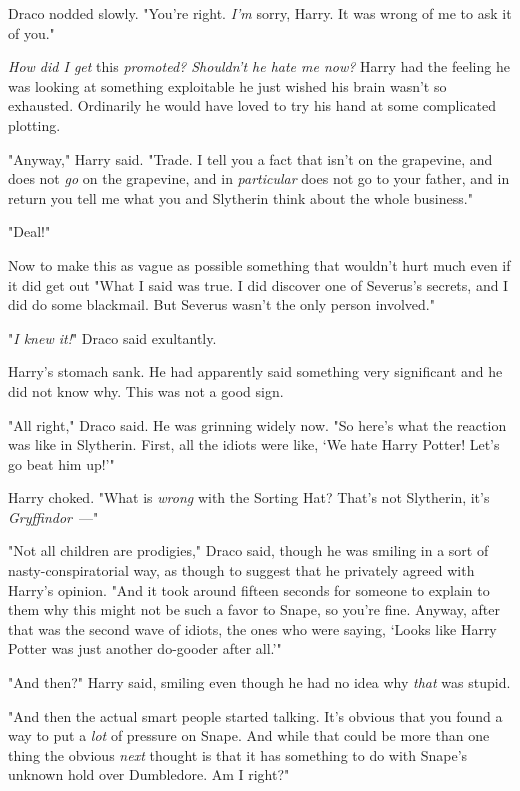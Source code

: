 Draco nodded slowly. "You're right. \emph{I'm} sorry, Harry. It was wrong of me
to ask it of you."

\emph{How did I get} this \emph{promoted? Shouldn't he hate me now?} Harry had
the feeling he was looking at something exploitable{\el} he just wished his
brain wasn't so exhausted. Ordinarily he would have loved to try his hand at
some complicated plotting.

"Anyway," Harry said. "Trade. I tell you a fact that isn't on the grapevine,
and does not \emph{go} on the grapevine, and in \emph{particular} does not go
to your father, and in return you tell me what you and Slytherin think about
the whole business."

"Deal!"

Now to make this as vague as possible{\el} something that wouldn't hurt much
even if it did get out{\el} "What I said was true. I did discover one of
Severus's secrets, and I did do some blackmail. But Severus wasn't the only
person involved."

"\emph{I knew it!}" Draco said exultantly.

Harry's stomach sank. He had apparently said something very significant and he
did not know why. This was not a good sign.

"All right," Draco said. He was grinning widely now. "So here's what the
reaction was like in Slytherin. First, all the idiots were like, `We hate Harry
Potter! Let's go beat him up!'"

Harry choked. "What is \emph{wrong} with the Sorting Hat? That's not Slytherin,
it's \emph{Gryffindor}~---"

"Not all children are prodigies," Draco said, though he was smiling in a sort
of nasty-conspiratorial way, as though to suggest that he privately agreed with
Harry's opinion. "And it took around fifteen seconds for someone to explain to
them why this might not be such a favor to Snape, so you're fine. Anyway, after
that was the second wave of idiots, the ones who were saying, `Looks like Harry
Potter was just another do-gooder after all.'"

"And then?" Harry said, smiling even though he had no idea why \emph{that} was
stupid.

"And then the actual smart people started talking. It's obvious that you found
a way to put a \emph{lot} of pressure on Snape. And while that could be more
than one thing{\el} the obvious \emph{next} thought is that it has something
to do with Snape's unknown hold over Dumbledore. Am I right?"

